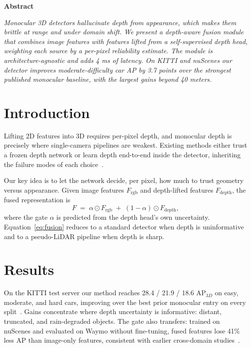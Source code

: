 \documentclass[10pt,twocolumn]{article}
\begin{document}

\begin{center}{\bfseries Abstract}\end{center}
\noindent\textit{Monocular 3D detectors hallucinate depth from appearance,
which makes them brittle at range and under domain shift. We present a
depth-aware fusion module that combines image features with features lifted
from a self-supervised depth head, weighting each source by a per-pixel
reliability estimate. The module is architecture-agnostic and adds 4 ms of
latency. On KITTI and nuScenes our detector improves moderate-difficulty car
AP by 3.7 points over the strongest published monocular baseline, with the
largest gains beyond 40 meters.}

\section{Introduction}
Lifting 2D features into 3D requires per-pixel depth, and monocular depth is
precisely where single-camera pipelines are weakest. Existing methods either
trust a frozen depth network or learn depth end-to-end inside the detector,
inheriting the failure modes of each choice~\cite{muller2023monodepth}.

Our key idea is to let the network decide, per pixel, how much to trust
geometry versus appearance. Given image features $F_{\mathrm{rgb}}$ and
depth-lifted features $F_{\mathrm{depth}}$, the fused representation is
\begin{equation}
  F \;=\; \alpha \odot F_{\mathrm{rgb}} \;+\; (1 - \alpha) \odot F_{\mathrm{depth}},
  \label{eq:fusion}
\end{equation}
where the gate $\alpha$ is predicted from the depth head's own uncertainty.
Equation~\eqref{eq:fusion} reduces to a standard detector when depth is
uninformative and to a pseudo-LiDAR pipeline when depth is sharp.

\section{Results}
On the KITTI test server our method reaches 28.4 / 21.9 / 18.6 AP$_{3D}$ on
easy, moderate, and hard cars, improving over the best prior monocular entry
on every split~\cite{devlin2024pseudolidar}. Gains concentrate where depth
uncertainty is informative: distant, truncated, and rain-degraded objects.
The gate also transfers: trained on nuScenes and evaluated on Waymo without
fine-tuning, fused features lose 41\% less AP than image-only features,
consistent with earlier cross-domain studies~\cite{tanaka2022crossdomain}.
\end{document}
